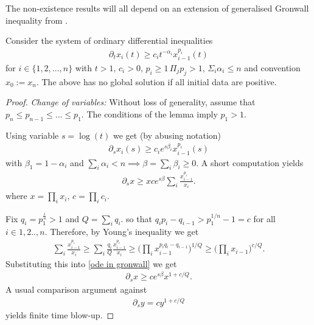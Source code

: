 \documentclass[11pt, oneside]{amsart}
\begin{document}
	The non-existence results will all depend on an extension of generalised Gronwall inequality from \cite{yang_revisit_2016}.
	\begin{lemma}\label{gronwall}
		Consider the system of ordinary differential inequalities
		\begin{equation*}
			\begin{gathered}
				\partial_tx_i(t)\geq c_i t^{-\alpha_i}x_{i-1}^{p_i}(t)
			\end{gathered}
		\end{equation*}
		for $i\in\{1,2,...,n\}$ with $t>1,\,c_i>0,\,p_i\geq1\,\Pi_jp_j>1,\,\Sigma_i\alpha_i\leq n$ and convention $x_{0}:=x_n$. The above has no global solution if all initial data are positive.
	\end{lemma}
	\begin{proof}
		\textit{Change of variables:}
		Without loss of generality, assume that $p_n\leq p_{n-1}\leq...\leq p_1$. The conditions of the lemma imply $p_1>1$.
		
		Using variable $s=\log(t)$  we get (by abusing notation)
		\begin{equation*}
			\begin{gathered}
				\partial_sx_i(s)\geq c_ie^{s\beta_i}x_{i-1}^{p_i}(s)
			\end{gathered}
		\end{equation*}
		with $\beta_1=1-\alpha_i$ and $\sum_i\alpha_i<n\implies\beta=\sum_i\beta_i\geq0$. A short computation yields
		\begin{equation}\label{ode in gronwall}
			\begin{gathered}
				\partial_sx\geq xce^{s\beta} \sum_i \frac{x_{i-1}^{p_i}}{x_i}.
			\end{gathered}
		\end{equation}
		where $x=\prod_i x_i,\,c=\prod_i c_i$.

		Fix $q_i=p_1^{\frac{i}{n}}>1$ and $Q=\sum_iq_i$. so that $q_ip_i-q_{i-1}>p_1^{1/n}-1=c$ for all $i\in{1,2..,n}$. Therefore, by Young's inequality we get		
		\begin{equation*}
			\begin{gathered}
				\sum_i \frac{x_{i-1}^{p_i}}{x_i}\geq \sum_i \frac{q_i}{Q}\frac{x_{i-1}^{p_i}}{x_i}\geq \big(\prod_i x_{i-1}^{p_{i}q_i-q_{i-1}}\big)^{1/Q}\geq \big(\prod_i x_{i-1}\big)^{c/Q}.
			\end{gathered}
		\end{equation*}
		Substituting this into \cref{ode in gronwall} we get
		\begin{equation*}
			\begin{gathered}
				\partial_s x\geq c e^{s\beta}x^{1+c/Q}.
			\end{gathered}
		\end{equation*}
		A usual comparison argument against 
		\begin{equation*}
			\begin{gathered}
				\partial_sy=cy^{1+c/Q}
			\end{gathered}
		\end{equation*}
		yields finite time blow-up.
	\end{proof}
	
\end{document}

